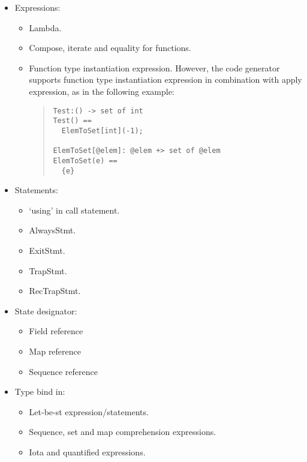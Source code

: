 \documentclass[a4paper,dvips]{article}
\begin{document}
\begin{itemize}
\item Expressions:

  \begin{itemize}
  \item Lambda.
  \item Compose, iterate and equality for functions.
  \item Function type instantiation expression. However, the code
    generator supports function type instantiation expression in
    combination with apply expression, as in the following example:

\begin{quote}
\begin{verbatim}
Test:() -> set of int
Test() ==
  ElemToSet[int](-1);

ElemToSet[@elem]: @elem +> set of @elem
ElemToSet(e) ==
  {e}
\end{verbatim}
\end{quote}

  \end{itemize}

\item Statements: 

  \begin{itemize}
  \item `{\sf using}' in call statement.
  \item AlwaysStmt.
  \item ExitStmt.
  \item TrapStmt.
  \item RecTrapStmt.
  \end{itemize}

\item State designator:

  \begin{itemize}
  \item Field reference
  \item Map reference
  \item Sequence reference
  \end{itemize}

\item Type bind in:

  \begin{itemize}
  \item Let-be-st expression/statements.
  \item Sequence, set and map comprehension expressions.
  \item Iota and quantified expressions.
  \end{itemize}


\end{itemize}
\end{document}
